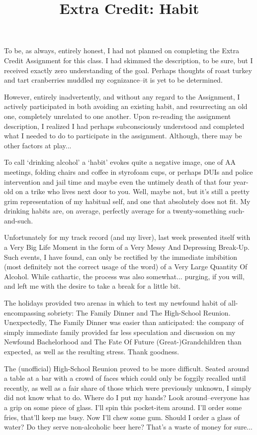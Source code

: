 \documentclass[letterpaper]{article}
\title{Extra Credit: Habit}
\date{}
\begin{document}
    \maketitle
    \onehalfspacing
    To be, as always, entirely honest, I had not planned on completing the Extra Credit Assignment for this class. I had skimmed the description, to be sure, but I received exactly zero understanding of the goal. Perhaps thoughts of roast turkey and tart cranberries muddled my cognizance--it is yet to be determined.

    However, entirely inadvertently, and without any regard to the Assignment, I actively participated in both avoiding an existing habit, and resurrecting an old one, completely unrelated to one another. Upon re-reading the assignment description, I realized I had perhaps subconsciously understood and completed what I needed to do to participate in the assignment. Although, there may be other factors at play...

    To call `drinking alcohol' a `habit' evokes quite a negative image, one of AA meetings, folding chairs and coffee in styrofoam cups, or perhaps DUIs and police intervention and jail time and maybe even the untimely death of that four year-old on a trike who lives next door to you. Well, maybe not, but it's still a pretty grim representation of my habitual self, and one that absolutely does not fit. My drinking habits are, on average, perfectly average for a twenty-something such-and-such.

    Unfortunately for my track record (and my liver), last week presented itself with a Very Big Life Moment in the form of a Very Messy And Depressing Break-Up. Such events, I have found, can only be rectified by the immediate imbibition (most definitely not the correct usage of the word) of a Very Large Quantity Of Alcohol. While cathartic, the process was also somewhat... purging, if you will, and left me with the desire to take a break for a little bit.

    The holidays provided two arenas in which to test my newfound habit of all-encompassing sobriety: The Family Dinner and The High-School Reunion. Unexpectedly, The Family Dinner was easier than anticipated: the company of simply immediate family provided far less speculation and discussion on my Newfound Bachelorhood and The Fate Of Future (Great-)Grandchildren than expected, as well as the resulting stress. Thank goodness.

    The (unofficial) High-School Reunion proved to be more difficult. Seated around a table at a bar with a crowd of faces which could only be foggily recalled until recently, as well as a fair share of those which were previously unknown, I simply did not know what to do. Where do I put my hands? Look around--everyone has a grip on some piece of glass. I'll spin this pocket-item around. I'll order some fries, that'll keep me busy. Now I'll chew some gum. Should I order a glass of water? Do they serve non-alcoholic beer here? That's a waste of money for sure...
\end{document}
